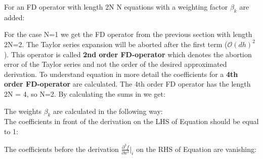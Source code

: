 \documentclass[11pt,onecolumn,oneside]{article}
\begin{document}

For an FD operator with length 2N N equations with a weighting factor $\beta_k$ are added:


For the case N=1 we get the FD operator from the previous section with length 2N=2. The Taylor series expansion will be aborted after the first  term (${\mathcal{O}}(dh)^{2}$). This operator is called {\bf{2nd order FD-operator}} which denotes the abortion error of the Taylor series and not the order of the desired approximated derivation. To understand equation  in more detail the coefficients for a {\bf{4th order FD-operator}} are calculated. The 4th order FD operator has the length 2N = 4, so N=2. By calculating the sums in  we get:


The weights $\beta_k$ are calculated in the following way:\\ 
The coefficients in front of the derivation on the LHS of Equation  should be equal to 1:


The coefficients before the derivation $\frac{\partial^3 f}{\partial x^3}\biggr|_i$ on the RHS of Equation  are vanishing:
\end{document}
